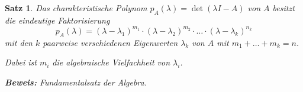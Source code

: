 \documentclass[%
a4paper,
11pt,		%
leqno,		%
]
{scrartcl}
\theoremstyle{plain}
\theoremstyle{plain}
\newtheorem{mysatz}[mydef]{Satz}
\begin{document}
\begin{mysatz}
Das charakteristische Polynom $p_A(\lambda) = \det(\lambda I - A)$ von $A$ besitzt die eindeutige Faktorisierung
\[
p_A(\lambda) = (\lambda - \lambda_1)^{m_1} \cdot (\lambda - \lambda_2)^{m_2} \cdot \ldots \cdot (\lambda - \lambda_k)^{n_k}
\]
mit den $k$ paarweise verschiedenen Eigenwerten $\lambda_k$ von $A$ mit $m_1 + \ldots + m_k = n$.

Dabei ist $m_i$ die algebraische Vielfachheit von $\lambda_i$.\newline

\textbf{Beweis:} Fundamentalsatz der Algebra.
\end{mysatz}


\end{document}
